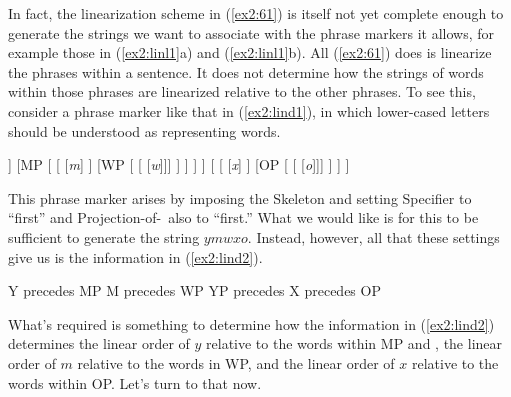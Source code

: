 In fact, the linearization scheme in (\ref{ex2:61}) is itself not yet complete enough to generate the strings we want to associate with the phrase markers it allows, for example those in (\ref{ex2:linl1}a) and (\ref{ex2:linl1}b). All (\ref{ex2:61}) does is linearize the phrases within a sentence. It does not determine how the strings of words within those phrases are linearized relative to the other phrases. To see this, consider a phrase marker like that in (\ref{ex2:lind1}), in which lower-cased letters should be understood as representing words.\enlargethispage*{20pt}
\begin{exe}
\ex \label{ex2:lind1} 
\small
\begin{forest}
[XP
	[YP 
		[\obar{Y} [\textit{y}] ]
		[MP [ 
			[ [\textit{m}] ]
			[WP [ [ [\textit{w}]]] ]
		] ]
	 ]
	[
		[ [\textit{x}] ]
		[OP [ [ [\textit{o}]]] ]
	 ]
]
\end{forest}
\end{exe}
This phrase marker arises by imposing the  Skeleton and setting Specifier to ``first'' and Projection-of-\al\ also to ``first.'' What we would like is for this to be sufficient to generate the string $ymwxo$. Instead, however, all that these settings give us is the information in (\ref{ex2:lind2}).
\begin{exe}
\ex \label{ex2:lind2} 
\begin{xlist}
	\ex Y precedes MP
	\ex M precedes WP
	\ex YP precedes 
	\ex X precedes OP
\end{xlist}
\end{exe}
What's required is something to determine how the information in (\ref{ex2:lind2}) determines the linear order of $y$ relative to the words within MP and , the linear order of $m$ relative to the words in WP, and the linear order of $x$ relative to the words within OP. Let's turn to that now.%
%
%

